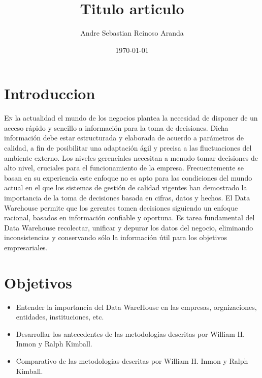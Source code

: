 \documentclass[twoside,twocolumn]{article}
\title{Titulo articulo}
\author{Andre Sebastian Reinoso Aranda\\
}
\date{\today}
\begin{document}
\maketitle


\section{Introduccion}
\lettrine[nindent=0em,lines=3]{E}n la actualidad el mundo de los negocios plantea la necesidad de disponer de un acceso rápido y sencillo a información para la toma de decisiones. Dicha información debe estar estructurada y elaborada de acuerdo a parámetros de calidad, a fin de posibilitar una adaptación ágil y precisa a las fluctuaciones del ambiente externo.
Los niveles gerenciales necesitan a menudo tomar decisiones de alto nivel, cruciales para el funcionamiento de la empresa. Frecuentemente se basan en su experiencia este enfoque no es apto para las condiciones del mundo actual en el que los sistemas de gestión de calidad vigentes han demostrado la importancia de la toma de decisiones basada en cifras, datos y hechos. El Data Warehouse permite que los gerentes tomen decisiones siguiendo un enfoque racional, basados en información confiable y oportuna. Es tarea fundamental del Data Warehouse recolectar, unificar y depurar los datos del negocio, eliminando inconsistencias y conservando sólo la información útil para los objetivos empresariales.





\section{Objetivos}

\begin{itemize}
\item Entender la importancia del Data WareHouse en las empresas, orgnizaciones, entidades, instituciones, etc.
\item Desarrollar los antecedentes de las metodologias descritas por William H. Inmon y Ralph Kimball.
\item Comparativo de las metodologias descritas por William H. Inmon y Ralph Kimball.

\end{itemize}
\end{document}
